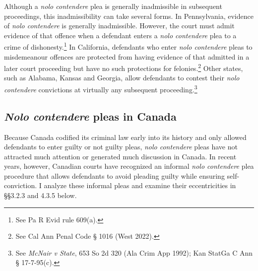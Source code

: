 Although a \textit{nolo contendere} plea is generally inadmissible in subsequent proceedings, this inadmissibility can take several forms. In Pennsylvania, evidence of \textit{nolo contendere} is generally inadmissible. However, the court must admit evidence of that offence when a defendant enters a \textit{nolo contendere} plea to a crime of dishonesty.\footnote{See Pa R Evid rule 609(a).} In California, defendants who enter \textit{nolo contendere} pleas to misdemeanour offences are protected from having evidence of that admitted in a later court proceeding but have no such protections for felonies.\footnote{See Cal Ann Penal Code § 1016 (West 2022).} Other states, such as Alabama, Kansas and Georgia, allow defendants to contest their \textit{nolo contendere} convictions at virtually any subsequent proceeding.\footnote{See \textit{McNair v State}, 653 So 2d 320 (Ala Crim App 1992); Kan StatGa C Ann § 17-7-95(c).}

\subsection{\textit{Nolo contendere} pleas in Canada}

Because Canada codified its criminal law early into its history and only allowed defendants to enter guilty or not guilty pleas, \textit{nolo contendere} pleas have not attracted much attention or generated much discussion in Canada. In recent years, however, Canadian courts have recognized an informal \textit{nolo contendere} plea procedure that allows defendants to avoid pleading guilty while ensuring self-conviction. I analyze these informal pleas and examine their eccentricities in \S\S 3.2.3 and 4.3.5 below.